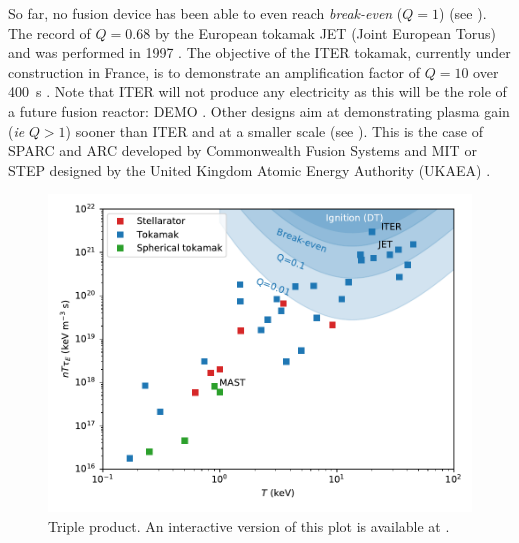 So far, no fusion device has been able to even reach \textit{break-even} ($Q = 1$) (see ).
The record of $Q = 0.68$ by the European tokamak JET (Joint European Torus) and was performed in 1997 .
The objective of the ITER tokamak, currently under construction in France, is to demonstrate an amplification factor of $Q=10$ over \SI{400}{s} . 
Note that ITER will not produce any electricity as this will be the role of a future fusion reactor: DEMO .
Other designs aim at demonstrating plasma gain (\textit{ie} $Q > 1$) sooner than ITER and at a smaller scale (see ).
This is the case of SPARC and ARC developed by Commonwealth Fusion Systems and MIT  or STEP designed by the United Kingdom Atomic Energy Authority (UKAEA) .

\begin{figure}
    \centering
    \includegraphics[width=\linewidth]{Figures/Chapter1/triple_product_vs_T.pdf}
    \caption{Triple product. An interactive version of this plot is available at \cite{delaporte-mathurin_remdelaportemathurinfusion-world_2022}.}
\end{figure}

